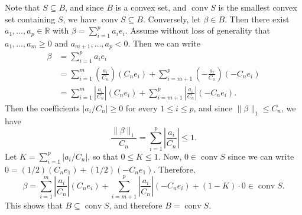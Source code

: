 \documentclass[letterpaper,12pt]{article}
\DeclareMathOperator{\conv}{conv}
\newcommand{\norm}[1]{\lVert#1\rVert}
\begin{document}
Note that $S \subseteq B$, and since $B$ is a convex set, and
$\conv S$ is the smallest convex set containing $S$, we have
$\conv S \subseteq B$. Conversely, let $\beta \in B$. Then there exist
$a_1, \ldots, a_p \in \mathbb{R}$ with $\beta = \sum_{i=1}^p a_i
e_i$. Assume without loss of generality that $a_1, \ldots, a_m \geq 0$
and $a_{m+1}, \ldots, a_p < 0$. Then we can write
\begin{align*}
  \beta &= \sum_{i=1}^p a_i e_i \\
        &= \sum_{i=1}^m \left ( \frac{a_i}{C_n} \right ) (C_n e_i)
          + \sum_{i=m+1}^p \left ( -\frac{a_i}{C_n} \right ) (-C_n e_i) \\
        &= \sum_{i=1}^m \left | \frac{a_i}{C_n} \right | (C_n e_i)
          + \sum_{i=m+1}^p \left | \frac{a_i}{C_n} \right | (-C_n e_i).
\end{align*}
Then the coefficients $|a_i / C_n| \geq 0$ for every
$1 \leq i \leq p$, and since $\norm{\beta}_1 \leq C_n$, we have
\begin{equation*}
  \frac{\norm{\beta}_1}{C_n}
    = \sum_{i=1}^p \left | \frac{a_i}{C_n} \right | \leq 1.
\end{equation*}
Let $K = \sum_{i=1}^p |a_i / C_n|$, so that $0 \leq K \leq 1$. Now,
$0 \in \conv S$ since we can write
$0 = (1/2) (C_n e_1) + (1/2) (-C_n e_1)$. Therefore,
\begin{equation*}
  \beta = \sum_{i=1}^m \left | \frac{a_i}{C_n} \right | (C_n e_i)
    + \sum_{i=m+1}^p \left | \frac{a_i}{C_n} \right | (-C_n e_i)
    + (1 - K) \cdot 0 \in \conv S.
\end{equation*}
This shows that $B \subseteq \conv S$, and therefore $B = \conv S$.
\end{document}
